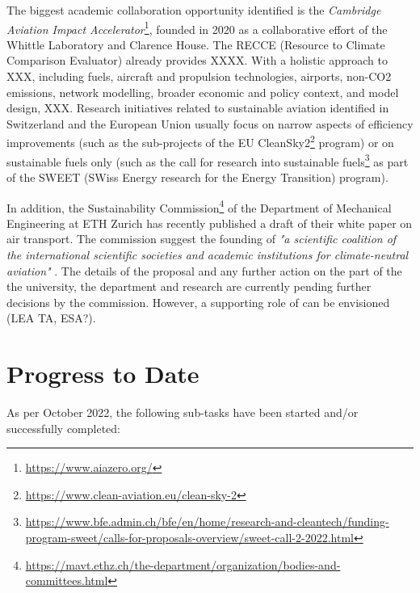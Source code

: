 \documentclass{article}
\begin{document}
	The biggest academic collaboration opportunity identified is the \textit{Cambridge Aviation Impact Accelerator}\footnote{\url{https://www.aiazero.org/}}, founded in 2020 as a collaborative effort of the Whittle Laboratory and Clarence House. The RECCE (Resource to Climate Comparison Evaluator) \cite{noauthor_recce_2022} already provides XXXX. 
 With a holistic approach to XXX, including fuels, aircraft and propulsion technologies, airports, non-CO2 emissions, network modelling, broader economic and policy context, and model design, XXX. Research initiatives related to sustainable aviation identified in Switzerland and the European Union usually focus on narrow aspects of efficiency improvements (such as the sub-projects of the EU CleanSky2\footnote{\url{https://www.clean-aviation.eu/clean-sky-2}} program) or on sustainable fuels only (such as the call for research into sustainable fuels\footnote{\url{https://www.bfe.admin.ch/bfe/en/home/research-and-cleantech/funding-program-sweet/calls-for-proposals-overview/sweet-call-2-2022.html}} as part of the SWEET (SWiss Energy research for the Energy Transition) program).
    
    In addition, the Sustainability Commission\footnote{\url{https://mavt.ethz.ch/the-department/organization/bodies-and-committees.html}} of the Department of Mechanical Engineering at ETH Zurich has recently published a draft of their white paper on air transport. The commission suggest the founding of  \textit{"a scientific coalition of the international scientific societies and academic institutions for climate-neutral aviation"} \cite{mazzotti_air_2022}. The details of the proposal and any further action on the part of the the university, the department and research are currently pending further decisions by the commission. However, a supporting role of can be envisioned (LEA TA, ESA?).



\newpage
\section{Progress to Date}

    As per October 2022, the following sub-tasks have been started and/or successfully completed:
    
\end{document}
